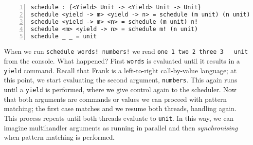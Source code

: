 \documentclass[msc,deptreport,cs]{infthesis} %
\newcommand{\code}[1]{\lstinline{#1}}
\begin{document}
\begin{lstlisting}[numbers=left]
schedule : {<Yield> Unit -> <Yield> Unit -> Unit}
schedule <yield -> m> <yield -> n> = schedule (m unit) (n unit)
schedule <yield -> m> <n> = schedule (m unit) n!
schedule <m> <yield -> n> = schedule m! (n unit)
schedule _ _ = unit
\end{lstlisting}

When we run \code{schedule words! numbers!} we read \code{one 1 two 2 three 3
  unit} from the console. What happened? First \code{words} is evaluated until
it results in a \code{yield} command. Recall that Frank is a left-to-right
call-by-value language; at this point, we start evaluating the second argument,
\code{numbers}. This again runs until a \code{yield} is performed, where we give
control again to the scheduler. Now that both arguments are commands or values
we can proceed with pattern matching; the first case matches and we resume both
threads, handling again. This process repeats until both threads evaluate to
\code{unit}. In this way, we can imagine multihandler arguments as running in
parallel and then \emph{synchronising} when pattern matching is performed.



\end{document}
